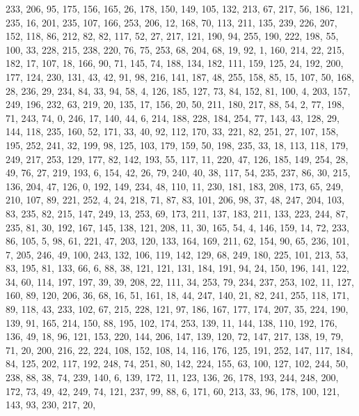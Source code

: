 \begin{DoxyCode}
       233, 206, 95, 175, 156, 165, 26, 178, 150, 149, 105, 132, 213, 67, 217, 56, 186, 121, 235, 16, 201, 235, 107,
       166, 253, 206, 12, 168, 70, 113, 211, 135, 239, 226, 207, 152, 118, 86, 212, 82, 82, 117, 52, 27, 217, 121,
       190, 94, 255, 190, 222, 198, 55, 100, 33, 228, 215, 238, 220, 76, 75, 253, 68, 204, 68, 19, 92, 1, 160,
       214, 22, 215, 182, 17, 107, 18, 166, 90, 71, 145, 74, 188, 134, 182, 111, 159, 125, 24, 192, 200, 177, 124,
       230, 131, 43, 42, 91, 98, 216, 141, 187, 48, 255, 158, 85, 15, 107, 50, 168, 28, 236, 29, 234, 84, 33, 94, 58,
       4, 126, 185, 127, 73, 84, 152, 81, 100, 4, 203, 157, 249, 196, 232, 63, 219, 20, 135, 17, 156, 20, 50, 211,
       180, 217, 88, 54, 2, 77, 198, 71, 243, 74, 0, 246, 17, 140, 44, 6, 214, 188, 228, 184, 254, 77, 143, 43,
       128, 29, 144, 118, 235, 160, 52, 171, 33, 40, 92, 112, 170, 33, 221, 82, 251, 27, 107, 158, 195, 252, 241, 32,
       199, 98, 125, 103, 179, 159, 50, 198, 235, 33, 18, 113, 118, 179, 249, 217, 253, 129, 177, 82, 142, 193, 55,
       117, 11, 220, 47, 126, 185, 149, 254, 28, 49, 76, 27, 219, 193, 6, 154, 42, 26, 79, 240, 40, 38, 117, 54,
       235, 237, 86, 30, 215, 136, 204, 47, 126, 0, 192, 149, 234, 48, 110, 11, 230, 181, 183, 208, 173, 65, 249,
       210, 107, 89, 221, 252, 4, 24, 218, 71, 87, 83, 101, 206, 98, 37, 48, 247, 204, 103, 83, 235, 82, 215, 147,
       249, 13, 253, 69, 173, 211, 137, 183, 211, 133, 223, 244, 87, 235, 81, 30, 192, 167, 145, 138, 121, 208, 11,
       30, 165, 54, 4, 146, 159, 14, 72, 233, 86, 105, 5, 98, 61, 221, 47, 203, 120, 133, 164, 169, 211, 62, 154,
       90, 65, 236, 101, 7, 205, 246, 49, 100, 243, 132, 106, 119, 142, 129, 68, 249, 180, 225, 101, 213, 53, 83,
       195, 81, 133, 66, 6, 88, 38, 121, 121, 131, 184, 191, 94, 24, 150, 196, 141, 122, 34, 60, 114, 197, 197, 39,
       39, 208, 22, 111, 34, 253, 79, 234, 237, 253, 102, 11, 127, 160, 89, 120, 206, 36, 68, 16, 51, 161, 18, 44,
       247, 140, 21, 82, 241, 255, 118, 171, 89, 118, 43, 233, 102, 67, 215, 228, 121, 97, 186, 167, 177, 174, 207,
       35, 224, 190, 139, 91, 165, 214, 150, 88, 195, 102, 174, 253, 139, 11, 144, 138, 110, 192, 176, 136, 49, 18,
       96, 121, 153, 220, 144, 206, 147, 139, 120, 72, 147, 217, 138, 19, 79, 71, 20, 200, 216, 22, 224, 108, 152,
       108, 14, 116, 176, 125, 191, 252, 147, 117, 184, 84, 125, 202, 117, 192, 248, 74, 251, 80, 142, 224, 155,
       63, 100, 127, 102, 244, 50, 238, 88, 38, 74, 239, 140, 6, 139, 172, 11, 123, 136, 26, 178, 193, 244, 248, 200,
       172, 73, 49, 42, 249, 74, 121, 237, 99, 88, 6, 171, 60, 213, 33, 96, 178, 100, 121, 143, 93, 230, 217, 20,

\end{DoxyCode}
